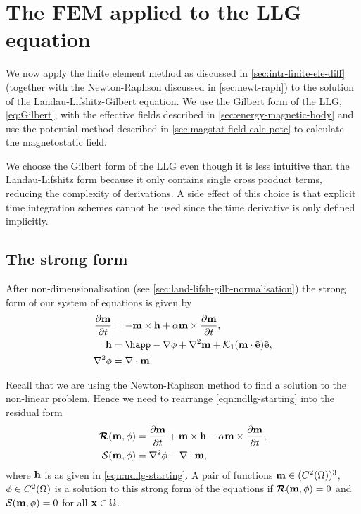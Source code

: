 {\section{The FEM applied to the LLG equation}
\label{sec:llg-initial-equations}

We now apply the finite element method as discussed in \cref{sec:intr-finite-ele-diff} (together with the Newton-Raphson discussed in \cref{sec:newt-raph}) to the solution of the Landau-Lifshitz-Gilbert equation.
We use the Gilbert form of the LLG, \cref{eq:Gilbert}, with the effective fields described in \cref{sec:energy-magnetic-body} and use the potential method described in \cref{sec:magstat-field-calc-pote} to calculate the magnetostatic field.

We choose the Gilbert form of the LLG even though it is less intuitive than the Landau-Lifshitz form because it only contains single cross product terms, reducing the complexity of derivations.
A side effect of this choice is that explicit time integration schemes cannot be used since the time derivative is only defined implicitly.

\subsection{The strong form}

After non-dimensionalisation (see \cref{sec:land-lifsh-gilb-normalisation}) the strong form of our system of equations is given by
\begin{equation}
  \begin{aligned}
    \dmdt &= - \mv \times \hv + \dampc \mv \times \dmdt, \\
    \hv &= \happ - \grad \phim + \lap \mv + \kone (\mv \cdot \ev) \ev, \\
    \lap \phim &= \div \mv.
    \label{eqn:ndllg-starting}
  \end{aligned}
\end{equation}

Recall that we are using the Newton-Raphson method to find a solution to the non-linear problem.
Hence we need to rearrange \cref{eqn:ndllg-starting} into the residual form
\begin{equation}
  \begin{align}
    \boldsymbol{\mathrm{\mathcal{R}}}(\boldsymbol{\mathrm{m}}, \phi) &= \frac{\partial \boldsymbol{\mathrm{m}}}{\partial t} + \boldsymbol{\mathrm{m}} \times \boldsymbol{\mathrm{h}} - \alpha \boldsymbol{\mathrm{m}} \times \frac{\partial \boldsymbol{\mathrm{m}}}{\partial t}, \label{eq:llgR} \\
    \mathcal{S}(\boldsymbol{\mathrm{m}}, \phi) &= \nabla^2 \phi - \nabla \cdot \boldsymbol{\mathrm{m}}, \label{eq:phiR}
  \end{align}
\end{equation}
where $\boldsymbol{\mathrm{h}}$ is as given in \cref{eqn:ndllg-starting}.
A pair of functions $\boldsymbol{\mathrm{m}} \in (C^2(\Omega))^3$, $\phi \in C^2(\Omega)$ is a solution to this strong form of the equations if $\boldsymbol{\mathrm{\mathcal{R}}}(\boldsymbol{\mathrm{m}}, \phi)=0$ and $\mathcal{S}(\boldsymbol{\mathrm{m}}, \phi)=0$ for all $\boldsymbol{\mathrm{x}} \in \Omega$.

}
